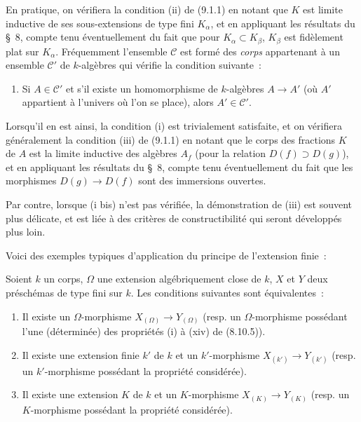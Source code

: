 \begin{remark}[9.1.3]
\label{IV.9.1.3-fr}
En pratique, on vérifiera la condition (ii) de (9.1.1) en notant que $K$ est
limite inductive de ses sous-extensions de type fini $K_\alpha$, et en
appliquant les résultats du \S~8, compte tenu éventuellement du fait que pour
$K_\alpha\subset K_\beta$, $K_\beta$ est fidèlement plat sur $K_\alpha$.
Fréquemment l'ensemble $\mathcal C$ est formé des \emph{corps} appartenant à
un ensemble $\mathcal C'$ de $k$-algèbres qui vérifie la condition suivante~:
\begin{enumerate}[label=(i bis)]
  \item Si $A\in\mathcal C'$ et s'il existe un homomorphisme de $k$-algèbres
  $A\to A'$ (où $A'$ appartient à l'univers où l'on se place), alors
  $A'\in\mathcal C'$.
\end{enumerate}
Lorsqu'il en est ainsi, la condition (i) est trivialement satisfaite, et on
vérifiera généralement la condition (iii) de (9.1.1) en notant que le corps
des fractions $K$ de $A$ est la limite inductive des algèbres $A_f$ (pour la
relation $D(f)\supset D(g)$), et en appliquant les résultats du \S~8, compte
tenu éventuellement du fait que les morphismes $D(g)\to D(f)$ sont des
immersions ouvertes.

Par contre, lorsque (i bis) n'est pas vérifiée, la démonstration de (iii) est
souvent plus délicate, et est liée à des critères de constructibilité qui
seront développés plus loin.
\end{remark}

Voici des exemples typiques d'application du principe de l'extension finie~:

\begin{proposition}[9.1.4]
\label{IV.9.1.4-fr}
Soient $k$ un corps, $\Omega$ une extension algébriquement close de $k$,
$X$ et $Y$ deux préschémas de type fini sur $k$. Les conditions suivantes
sont équivalentes~:
\begin{enumerate}[label=\emph{\alph*)}]
  \item Il existe un $\Omega$-morphisme $X_{(\Omega)}\to Y_{(\Omega)}$
  (resp. un $\Omega$-morphisme possédant l'une (déterminée) des propriétés
  (i) à (xiv) de (8.10.5)).
  \item Il existe une extension finie $k'$ de $k$ et un $k'$-morphisme
  $X_{(k')}\to Y_{(k')}$ (resp. un $k'$-morphisme possédant la propriété
  considérée).
  \item Il existe une extension $K$ de $k$ et un $K$-morphisme
  $X_{(K)}\to Y_{(K)}$ (resp. un $K$-morphisme possédant la propriété
  considérée).
\end{enumerate}
\end{proposition}

